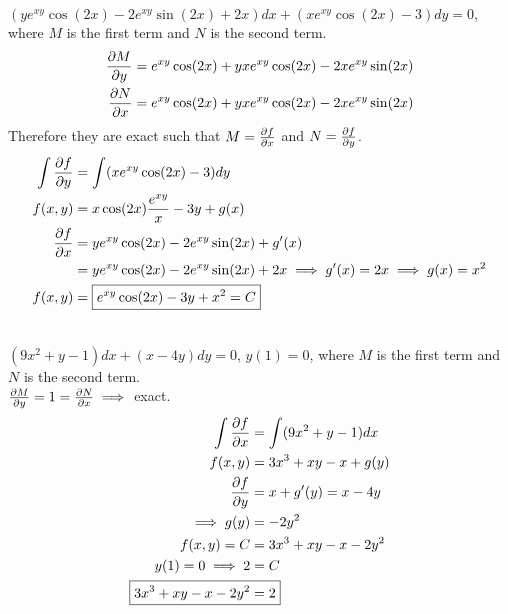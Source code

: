 \documentclass{article}
\begin{document}
\sol \\
$(y e^{xy} \cos (2x) - 2 e^{xy} \sin (2x) +2x) dx + (x e^{xy} \cos (2x) - 3) dy = 0$, where $M$ is the first term and $N$ is the second term.
\begin{align*}
  \frac{\partial M}{\partial y} &= e^{xy} \cos(2x) + yx e^{xy} \cos(2x) - 2xe^{xy} \sin(2x) \\
  \frac{\partial N}{\partial x} &= e^{xy} \cos(2x) + yx e^{xy} \cos(2x) - 2xe^{xy} \sin(2x)
\end{align*}
Therefore they are exact such that $M = \frac{\partial f}{\partial x}$ and $N = \frac{\partial f}{\partial y}$.
\begin{align*}
  \int \frac{\partial f}{\partial y} &= \int (x e^{xy} \cos (2x) -3) dy \\
  f(x,y) &= x \cos (2x) \frac{e^{xy}}{x} -3y + g(x) \\
  \frac{\partial f}{\partial x} &= ye^{xy} \cos(2x) - 2e^{xy} \sin(2x) + g'(x) \\
  &= ye^{xy} \cos(2x) - 2e^{xy} \sin(2x) + 2x \implies g'(x) = 2x \implies g(x) = x^2 \\
  f(x,y) &= \boxed{e^{xy} \cos(2x)  -3y + x^2 = C}
\end{align*}



\sol \\
$(9x^2+y-1)dx + (x-4y)dy = 0$, $y(1) = 0$, where $M$ is the first term and $N$ is the second term. \\
$\frac{\partial M}{\partial y} = 1 = \frac{\partial N}{\partial x} \implies$ exact.
\begin{align*}
  \int \del{f}{x} &= \int (9x^2+y-1) dx \\
  f(x,y) &= 3x^3 + xy - x + g(y) \\
  \del{f}{y} &= x + g'(y) = x - 4y \\
  \implies g(y) &= -2y^2 \\
  f(x,y) = C &= 3x^3 + xy - x - 2y^2 \\
  y(1)= 0 \implies 2 &= C \\
  \Aboxed{3x^3 + xy -x -2y^2 &= 2}
\end{align*}
\end{document}
